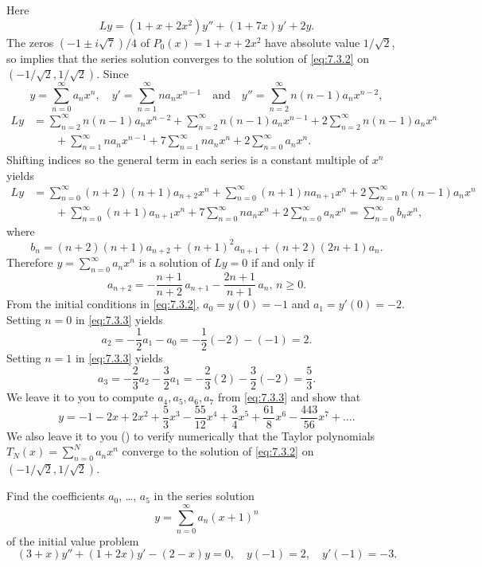 \begin{solution}
Here
\[
Ly=(1+x+2x^2)y''+(1+7x)y'+2y.
\]
The zeros $(-1\pm i\sqrt7)/4$ of $P_0(x)=1+x+2x^2$ have absolute value
$1/\sqrt2$, so  implies that the series
solution
converges to the solution of \eqref{eq:7.3.2} on $(-1/\sqrt2,1/\sqrt2)$.
Since
\[
y=\sum^\infty_{n=0} a_nx^n,\quad y'=\sum^\infty_{n=1} n
a_nx^{n-1}\quad\text{and}\quad  y''=\sum^\infty_{n=2}n(n-1)a_nx^{n-2},
\]
\begin{align*}
Ly&=\sum^\infty_{n=2}n(n-1)a_nx^{n-2}+\sum^\infty_{n=2}n(n-1)a_nx^{n-1}
+2\sum^\infty_{n=2}n(n-1)a_nx^n\\
&\qquad{}+\sum^\infty_{n=1}na_nx^{n-1}+7\sum^\infty_{n=1}na_nx^n+2\sum^\infty_{n=0}
a_nx^n.
\end{align*}
Shifting indices so  the general term in each
series is a constant multiple of $x^n$ yields
\begin{align*}
Ly&=\sum^\infty_{n=0}(n+2)(n+1)a_{n+2}x^n+\sum^\infty_{n=0}(n+1)na_{n+1}x^n
+2\sum^\infty_{n=0}n(n-1)a_nx^n\\
&\qquad{}+\sum^\infty_{n=0}(n+1)a_{n+1}x^n+7\sum^\infty_{n=0}na_nx^n+
2\sum^\infty_{n=0}a_nx^n
=\sum^\infty_{n=0}b_nx^n,
\end{align*}
where
\[
b_n=(n+2)(n+1)a_{n+2}+(n+1)^2a_{n+1}+(n+2)(2n+1)a_n.
\]
Therefore $y=\sum^\infty_{n=0}a_nx^n$ is a solution of $Ly=0$
if and only if
\begin{equation} \label{eq:7.3.3}
a_{n+2}=-\frac{n+1}{n+2}\,a_{n+1}-\frac{2n+1}{n+1}\,a_n,\,n\ge0.
\end{equation}
From the initial conditions in \eqref{eq:7.3.2}, $a_0=y(0)=-1$ and
$a_1=y'(0)=-2$.
Setting $n=0$  in \eqref{eq:7.3.3} yields
\[
a_2=-\frac{1}{2}a_1-a_0=-\frac{1}{2}(-2)-(-1)=2.
\]
Setting $n=1$  in \eqref{eq:7.3.3} yields
\[
a_3=-\frac{2}{3}a_2-\frac{3}{2}a_1=-\frac{2}{3}(2)-\frac{3}{2}(-2)=\frac{5}{3}.
\]
We leave it to you to compute $a_4,a_5,a_6,a_7$ from \eqref{eq:7.3.3} and
show that
\[
y=-1-2x+2x^2+\frac{5}{3}x^3-\frac{55}{12}x^4+\frac{3}{4}x^5+\frac{61}{8}x^6-
\frac{443}{56}x^7+\dots .
\]
We also leave it to you () to verify numerically
that the Taylor polynomials $T_N(x)=\sum_{n=0}^Na_nx^n$ converge
to the solution of \eqref{eq:7.3.2}
on $(-1/\sqrt2,1/\sqrt2)$.
\end{solution}

\begin{example}\label{example:7.3.2}
Find  the coefficients $a_0$, \dots, $a_5$ in the series
solution
\[
y=\sum^\infty_{n=0} a_n(x+1)^n
\]
 of the initial value problem
\begin{equation} \label{eq:7.3.4}
(3+x)y''+(1+2x)y'-(2-x)y=0,\quad y(-1)=2,\quad y'(-1)=-3.
\end{equation}
\end{example}

